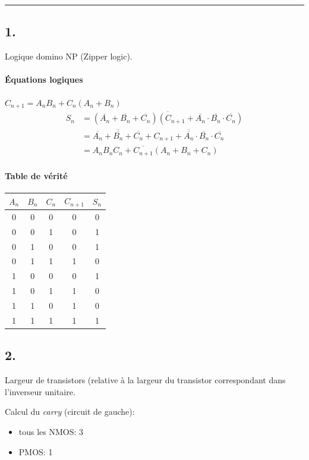\documentclass[frenchb,DIV=14]{scrartcl}
\begin{document}
\hspace{1cm}\hrule

\subsection*{1.}

Logique domino NP (Zipper logic).

\paragraph{Équations logiques}
$C_{n+1} = A_n B_n + C_n (A_n + B_n)$
\begin{align*}
    S_n &= \overline{(\overline{A_n} + \overline{B_n} + \overline{C_n})(C_{n+1} + \overline{A_n}\cdot\overline{B_n}\cdot\overline{C_n})} \\
    &=  \overline{\overline{A_n}+\overline{B_n}+\overline{C_n}} + \overline{C_{n+1} + \overline{A_n}\cdot\overline{B_n}\cdot\overline{C_n}} \\
    &= A_n B_n C_n + \overline{C_{n+1}}(A_n+B_n+C_n)
\end{align*}

\paragraph{Table de vérité}

\begin{center}
    \begin{tabular}{ccc|cc}
        $A_n$&$B_n$&$C_n$&$C_{n+1}$&$S_n$\\
        \hline
        0&0&0&0&0\\
        0&0&1&0&1\\
        0&1&0&0&1\\
        0&1&1&1&0\\
        1&0&0&0&1\\
        1&0&1&1&0\\
        1&1&0&1&0\\
        1&1&1&1&1
    \end{tabular}
\end{center}

\subsection*{2.}

Largeur de transistors (relative à la largeur du transistor correspondant
dans l'inverseur unitaire.

Calcul du \emph{carry} (circuit de gauche):
\begin{itemize}
    \item tous les NMOS: 3
    \item PMOS: 1
\end{itemize}
\end{document}
